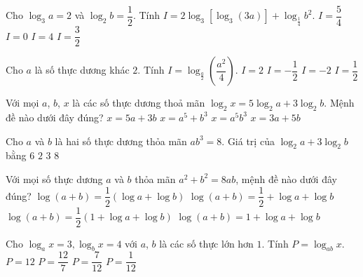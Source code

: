 \begin{ex}%
	[Mã 105 2017]
	Cho $\log_3a=2$ và $\log_2b=\dfrac{1}{2}$. Tính $I=2\log_3\left[\log_3\left(3a\right)\right]+\log_{\frac{1}{4}}{b^2}$.
	\choice
	{$I=\dfrac{5}{4}$}
	{$I=0$}
	{$I=4$}
	{\True $I=\dfrac{3}{2}$}
\end{ex}
\begin{ex}%
	[Mã 105 2017]
	Cho $a$ là số thực dương khác $2$. Tính $I=\log_{\frac{a}{2}}\left(\dfrac{a^2}{4}\right)$.
	\choice
	{\True $I=2$}
	{$I=-\dfrac{1}{2}$}
	{$I=-2$}
	{$I=\dfrac{1}{2}$}
\end{ex}
\begin{ex}%
	[Mã 104 2017]
	Với mọi $a$, $b$, $x$ là các số thực dương thoả mãn $\log_2x=5\log_2a+3\log_2b$. Mệnh đề nào dưới đây đúng?
	\choice
	{$x=5a+3b$}
	{$x=a^5+b^3$}
	{\True $x=a^5b^3$}
	{$x=3a+5b$}
\end{ex}
\begin{ex}%
	[Mã 104 2019]
	Cho $a$ và $b$ là hai số thực dương thỏa mãn $a{b^3}=8$. Giá trị của $\log_2a+3\log_2b$ bằng
	\choice
	{$6$}
	{$2$}
	{\True $3$}
	{$8$}
\end{ex}
\begin{ex}%
	[Mã 105 2017]
	Với mọi số thực dương $a$ và $b$ thỏa mãn $a^2+b^2=8ab$, mệnh đề nào dưới đây đúng?
	\choice
	{$\log\left(a+b\right)=\dfrac{1}{2}\left(\log a+\log b\right)$}
	{$\log\left(a+b\right)=\dfrac{1}{2}+\log a+\log b$}
	{\True $\log\left(a+b\right)=\dfrac{1}{2}\left(1+\log a+\log b\right)$}
	{$\log\left(a+b\right)=1+\log a+\log b$}
\end{ex}
\begin{ex}%
	[Mã 123 2017]
	Cho $\log_ax=3,\log_bx=4$ với $a$, $b$ là các số thực lớn hơn $1$. Tính $ P=\log_{ab}x$.
	\choice
	{$P=12$}
	{\True $P=\dfrac{12}{7}$}
	{$P=\dfrac{7}{12}$}
	{$P=\dfrac{1}{12}$}
\end{ex}
